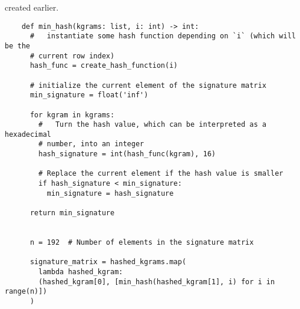 \documentclass{article}
\begin{document}
  created earlier.
  \begin{verbatim}
    def min_hash(kgrams: list, i: int) -> int:
      #   instantiate some hash function depending on `i` (which will be the
      # current row index)
      hash_func = create_hash_function(i)

      # initialize the current element of the signature matrix
      min_signature = float('inf')

      for kgram in kgrams:
        #   Turn the hash value, which can be interpreted as a hexadecimal
        # number, into an integer
        hash_signature = int(hash_func(kgram), 16)

        # Replace the current element if the hash value is smaller
        if hash_signature < min_signature:
          min_signature = hash_signature

      return min_signature


      n = 192  # Number of elements in the signature matrix

      signature_matrix = hashed_kgrams.map(
        lambda hashed_kgram:
        (hashed_kgram[0], [min_hash(hashed_kgram[1], i) for i in range(n)])
      )
  \end{verbatim}
\end{document}
